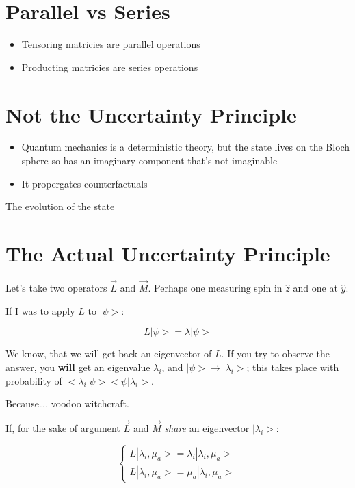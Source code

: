 \documentclass[letterpaper]{article}
\begin{document}
\section{Parallel vs Series}
\label{sec:org99d3168}
\begin{itemize}
\item Tensoring matricies are  parallel operations
\item Producting matricies are series operations
\end{itemize}

\section{Not the Uncertainty Principle}
\label{sec:orgc42eeff}
\begin{itemize}
\item Quantum mechanics is a deterministic theory, but the state lives on the Bloch sphere so has an imaginary component that's not imaginable
\item It propergates counterfactuals
\end{itemize}

The evolution of the state

\section{The Actual Uncertainty Principle}
\label{sec:org2dd8ad9}
Let's take two operators \(\vec{L}\) and \(\vec{M}\). Perhaps one measuring spin in \(\hat{z}\) and one at \(\hat{y}\).

If I was to apply \(L\) to \(|\psi\big>\):

\begin{equation}
   L|\psi\big> = \lambda |\psi \big> 
\end{equation}

We know, that we will get back an eigenvector of \(L\). If you try to observe the answer, you \textbf{will} get an eigenvalue \(\lambda_i\), and \(|\psi\big> \to |\lambda_i\big>\); this takes place with probability of \(\big<\lambda_i|\psi\big>\big<\psi|\lambda_i\big>\).

Because\ldots{}. voodoo witchcraft.

If, for the sake of argument \(\vec{L}\) and \(\vec{M}\) \emph{share} an eigenvector \(|\lambda_i\big>\):

\begin{equation}
   \begin{cases}
L|\lambda_i, \mu_a \big> = \lambda_i | \lambda_i, \mu_a\big>\\
L|\lambda_i, \mu_a \big> = \mu_a | \lambda_i, \mu_a\big>
\end{cases}
\end{equation}
\end{document}
